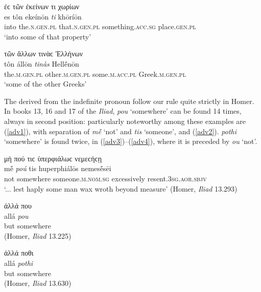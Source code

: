 \begin{exe}
\ex ἐϲ τῶν ἐκείνων τι χωρίων\\
\gll es tôn ekeínōn \emph{ti} khōríōn\\
into the.\textsc{n.gen.pl} that.\textsc{n.gen.pl} something.\textsc{acc.sg} place.\textsc{gen.pl}\\
\trans `into some of that property'
\label{example2}
\end{exe}

\begin{exe}
\ex τῶν ἄλλων τινὰϲ Ἑλλήνων\\
\gll tôn állōn \emph{tinàs} Hellḗnōn\\
the.\textsc{m.gen.pl} other.\textsc{m.gen.pl} some.\textsc{m.acc.pl}
Greek.\textsc{m.gen.pl}\\
\trans `some of the other Greeks'
\label{example3}
\end{exe}

The  derived from the indefinite pronoun follow our rule quite strictly in Homer. In books 13, 16 and 17 of the \textit{Iliad}, \textit{pou} `somewhere' can be found 14 times, always in second position: particularly noteworthy among these examples are (\ref{adv1}), with separation of \textit{mḗ} `not' and \textit{tis} `someone', and (\ref{adv2}). \textit{pothi} `somewhere' is found twice, in (\ref{adv3})--(\ref{adv4}), where it is preceded by \textit{ou} `not'.

\begin{exe}
\ex μή πού τιϲ ὑπερφιάλωϲ νεμεϲήϲῃ\\
\gll mḗ \emph{poú} tis huperphiálōs nemesḗsēi\\
not somewhere someone.\textsc{m.nom.sg} excessively resent.\textsc{3sg.aor.sbjv}\\
\trans `... lest haply some man wax wroth beyond measure' (Homer, \textit{Iliad} 13.293)
\label{adv1}
\end{exe}

\begin{exe}
\ex ἀλλά που\\
\gll allá \emph{pou}\\
but somewhere\\
\trans (Homer, \textit{Iliad} 13.225)
\label{adv2}
\end{exe}

\begin{exe}
\ex ἀλλά ποθι\\
\gll allá \emph{pothi}\\
but somewhere\\
\trans (Homer, \textit{Iliad} 13.630)
\label{adv3}
\end{exe}

